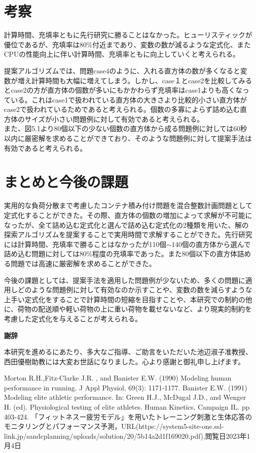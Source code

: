 \documentclass[12pt,fleqn]{jreport}
\begin{document}
\chapter{考察}
\vspace{2cm}
計算時間、充填率ともに先行研究に勝ることはなかった。ヒューリスティックが優位であるが、充填率は80\%付近まであり、変数の数が減るような定式化、またCPUの性能向上に伴い計算時間、充填率ともに向上していくと考えられる。

提案アルゴリズムでは、問題case4のように、入れる直方体の数が多くなると変数が増え計算時間も大幅に増えてしまう。しかし、case１とcase2を比較してみるとcase2の方が直方体の個数が多いにもかかわらず充填率はcase1よりも高くなっている。これはcase1で扱われている直方体の大きさより比較的小さい直方体がcase2で扱われているためであると考えられる。個数の多寡によらず詰め込む直方体のサイズが小さい問題例に対して有効であると考えられる。\\
また、図5.1より80個以下の少ない個数の直方体から成る問題例に対しては60秒以内に厳密解を求めることができており、そのような問題例に対して提案手法は有効であると考えられる。


\newpage
\chapter{まとめと今後の課題}
\vspace{1cm}
実用的な負荷分散まで考慮したコンテナ積み付け問題を混合整数計画問題として定式化することができた。その際、直方体の個数の増加によって求解が不可能になったが、全て詰め込む定式化と選んで詰め込む定式化の2種類を用いた、解の探索アルゴリズムを提案することで実用時間で求解することができた。先行研究には計算時間、充填率で勝ることはなかったが110個$\sim$140個の直方体から選んで詰め込む問題に対しては80$\%$程度の充填率であった。また80個以下の直方体詰める問題では高速に厳密解を求めることができた。

今後の課題としては、提案手法を適用した問題例が少ないため、多くの問題に適用しどのような問題例に対して有効なのか示すことや、変数の数を減らすような上手い定式化をすることで計算時間の短縮を目指すことや、本研究での制約の他に、荷物の配送順や軽い荷物の上に重い荷物を載せないなど、より現実的制約を考慮した定式化を与えることが考えられる。
\newpage
\begin{flushleft}
  {\Huge\textbf{謝辞}}
\end{flushleft}
\vspace{2cm}
本研究を進めるにあたり、多大なご指導、ご助言をいただいた池辺淑子准教授、西田優樹助教には大変お世話になりました。心より感謝と御礼申し上げます。
\newpage
\begin{thebibliography}{99}
  Morton R.H.,Fitz-Clarke J.R. , and Banister E.W. (1990) Modeling human performance in running. J Appl Physiol. 69(3): 1171-1177.
  Banister E.W. (1991) Modeling elite athletic performance. In: Green H.J., McDugal J.D., and Wenger H. (ed). Physiological testing of elite athletes. Human Kinetics, Campaign IL. pp 403-424.
  「フィットネスー疲労モデル」を用いたトレーニング刺激と生体応答のモニタリングとパフォーマンス予測，URL(https://system5-site-one.ssl-link.jp/sandcplanning/uploads/solution/20/5b14a2d1f169020.pdf),閲覧日2023年1月4日
\end{thebibliography}
\end{document}
